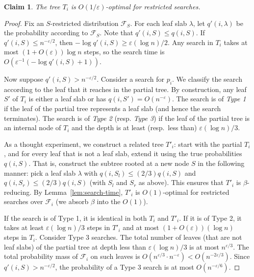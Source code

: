 \documentclass[letterpaper,11pt]{article}
\newtheorem{claim}[theorem]{Claim}
\newcommand{\eps}{\varepsilon}
\newcommand{\cF}{\mathcal{F}}
\begin{document}
\begin{claim}\label{clm:1/eps} 
  The tree $T_i$ is $O(1/\eps)$-optimal
  for restricted searches. 
\end{claim}

\begin{proof}
Fix an $S$-restricted
distribution $\cF_S$. For each leaf
slab $\lambda$, let $q'(i,\lambda)$ 
be the probability according to 
$\cF_S$. Note that 
$q'(i,S) \leq q(i,S)$.
If $q'(i,S) \leq n^{-\eps/2}$, 
then $-\log q'(i,S) \geq \eps (\log n)/2$.
Any search in $T_i$ takes at 
most $(1+O(\eps))\log n$ steps,
so the search time is
$O(\eps^{-1}(-\log q'(i,S) + 1))$.

Now suppose $q'(i,S) > n^{-\eps/2}$. 
Consider a search for $p_i$.
We classify the search according to 
the leaf that it reaches in
the partial tree.
By construction, any leaf $S'$
of $T_i$ is either a leaf slab or
has $q(i,S') = O(n^{-\eps})$.
The search is of \emph{Type 1} 
if the leaf of the partial tree 
represents a leaf slab (and 
hence the search terminates). 
The search is of \emph{Type 2} 
(resp. \emph{Type 3}) if the 
leaf of the partial tree 
is an internal node of $T_i$
and the depth is at least 
(resp.~less than) $\eps(\log n)/3$. 

As a thought experiment,
we construct a related tree 
$T'_i$: start with the partial 
$T_i$, and for every leaf that 
is not a leaf slab, extend it 
using the true 
probabilities $q(i,S)$. That  
is, construct the 
subtree rooted at a new node $S$
in the following manner: pick a leaf 
slab $\lambda$ with
$q(i,S_l) \leq (2/3)q(i,S)$ and
$q(i,S_r) \leq (2/3)q(i,S)$ 
(with $S_l$ and $S_r$ as above). 
This ensures that $T'_i$ is 
$\beta$-reducing.
By Lemma~\ref{lem:search-time}, $T'_i$ 
is $O(1)$-optimal for restricted 
searches over $\cF_i$ (we absorb 
$\beta$ into the $O(1)$).


If the search is of Type 1, 
it is identical in both $T_i$ 
and $T'_i$. If
it is of Type 2, it 
takes at least $\eps(\log n)/3$ 
steps in $T'_i$ and at most
$(1+O(\eps))(\log n)$ steps 
in $T_i$. 
Consider Type 3 searches.
The total number of leaves 
(that are not leaf slabs)
of the partial tree at depth 
less than $\eps(\log n)/3$ is 
at most $n^{\eps/3}$.
The total probability mass 
of $\cF_i$ on such leaves is 
$O(n^{\eps/3}\cdot n^{-\eps}) < O(n^{-2\eps/3})$.
Since $q'(i,S) > n^{-\eps/2}$,
the probability of a Type 3 
search is at most $O(n^{-\eps/6})$.


\end{proof}
\end{document}
